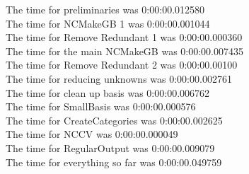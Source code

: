 \documentclass[rep10,leqno]{report}
\begin{document}
\noindent
The time for preliminaries was 0:00:00.012580\\
The time for NCMakeGB 1 was 0:00:00.001044\\
The time for Remove Redundant 1 was 0:00:00.000360\\
The time for the main NCMakeGB was 0:00:00.007435\\
The time for Remove Redundant 2 was 0:00:00.00100\\
The time for reducing unknowns was 0:00:00.002761\\
The time for clean up basis was 0:00:00.006762\\
The time for SmallBasis was 0:00:00.000576\\
The time for CreateCategories was 0:00:00.002625\\
The time for NCCV was 0:00:00.000049\\
The time for RegularOutput was 0:00:00.009079\\
The time for everything so far was 0:00:00.049759\\
\end{document}
